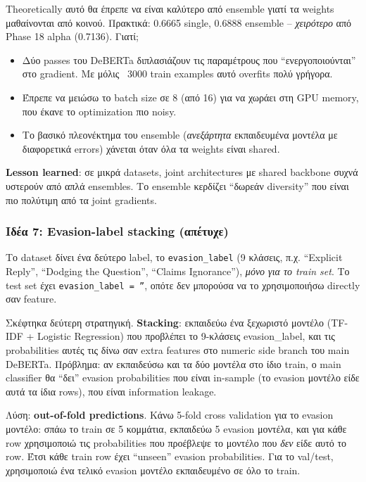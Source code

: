 \documentclass[12pt]{fphw}
\begin{document}
Theoretically αυτό θα έπρεπε να είναι καλύτερο από ensemble γιατί τα weights μαθαίνονται από κοινού. Πρακτικά: 0.6665 single, 0.6888 ensemble -- \emph{χειρότερο} από Phase 18 alpha (0.7136). Γιατί;

\begin{itemize}
    \item Δύο passes του DeBERTa διπλασιάζουν τις παραμέτρους που ``ενεργοποιούνται'' στο gradient. Με μόλις ~3000 train examples αυτό overfits πολύ γρήγορα.
    \item Έπρεπε να μειώσω το batch size σε 8 (από 16) για να χωράει στη GPU memory, που έκανε το optimization πιο noisy.
    \item Το βασικό πλεονέκτημα του ensemble (\emph{ανεξάρτητα} εκπαιδευμένα μοντέλα με διαφορετικά errors) χάνεται όταν όλα τα weights είναι shared.
\end{itemize}

\textbf{Lesson learned}: σε μικρά datasets, joint architectures με shared backbone συχνά υστερούν από απλά ensembles. Το ensemble κερδίζει ``δωρεάν diversity'' που είναι πιο πολύτιμη από τα joint gradients.

\subsubsection{Ιδέα 7: Evasion-label stacking (απέτυχε)}

Το dataset δίνει ένα δεύτερο label, το \texttt{evasion\_label} (9 κλάσεις, π.χ. ``Explicit Reply'', ``Dodging the Question'', ``Claims Ignorance''), \emph{μόνο για το train set}. Το test set έχει \texttt{evasion\_label = ''}, οπότε δεν μπορούσα να το χρησιμοποιήσω directly σαν feature.

Σκέφτηκα δεύτερη στρατηγική. \textbf{Stacking}: εκπαιδεύω ένα ξεχωριστό μοντέλο (TF-IDF + Logistic Regression) που προβλέπει το 9-κλάσεις evasion\_label, και τις probabilities αυτές τις δίνω σαν extra features στο numeric side branch του main DeBERTa. Πρόβλημα: αν εκπαιδεύσω και τα δύο μοντέλα στο ίδιο train, ο main classifier θα ``δει'' evasion probabilities που είναι in-sample (το evasion μοντέλο είδε αυτά τα ίδια rows), που είναι information leakage.

Λύση: \textbf{out-of-fold predictions}. Κάνω 5-fold cross validation για το evasion μοντέλο: σπάω το train σε 5 κομμάτια, εκπαιδεύω 5 evasion μοντέλα, και για κάθε row χρησιμοποιώ τις probabilities που προέβλεψε το μοντέλο που \emph{δεν} είδε αυτό το row. Έτσι κάθε train row έχει ``unseen'' evasion probabilities. Για το val/test, χρησιμοποιώ ένα τελικό evasion μοντέλο εκπαιδευμένο σε όλο το train.
\end{document}
